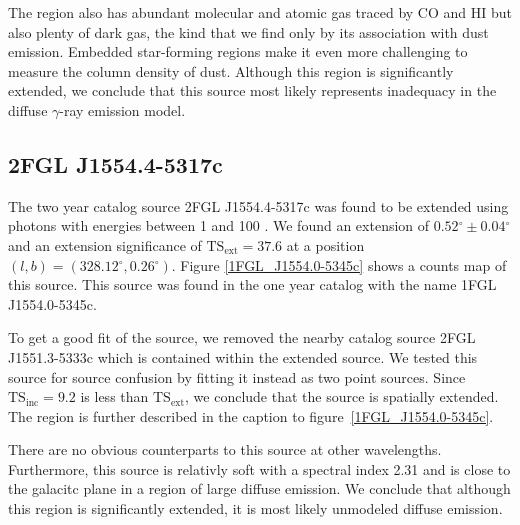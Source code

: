 \documentclass[12pt,preprint]{aastex}
\newcommand{\gev}{\text{GeV}\xspace}
\newcommand{\tsext}{{\ensuremath{\text{TS}_\text{ext}}}\xspace}
\newcommand{\tsinc}{\ensuremath{\text{TS}_\text{inc}}\xspace}
\renewcommand{\deg}{\ensuremath{^\circ}\xspace}
\begin{document}
The region also has abundant molecular and atomic gas traced by CO
and HI but also plenty of dark gas, the kind that we find only by its
association with dust emission. Embedded star-forming regions make it even
more challenging to measure the column density of dust.  Although this
region is significantly extended, we conclude that this source most
likely represents inadequacy in the diffuse $\gamma$-ray emission model.


\subsection{2FGL J1554.4-5317c}
\label{section_2FGL_J1554.4-5317c}


The two year catalog source 2FGL J1554.4-5317c was found to be extended
using photons with energies between 1 \gev and 100 \gev.  We found an
extension of $0.52\deg\pm 0.04\deg$ and an extension significance of
$\tsext=37.6$ at a position $(l,b)=(328.12\deg,0.26\deg)$.  Figure
\ref{1FGL_J1554.0-5345c} shows a counts map of this source.
This source was found in the one year catalog with the name 1FGL J1554.0-5345c.

To get a good fit of the source, we removed the nearby catalog source
2FGL J1551.3-5333c which is contained within the extended source.
We tested this source for source confusion by fitting it instead
as two point sources.  Since $\tsinc=9.2$ is less than \tsext,
we conclude that the source is spatially extended. The region is further described in
the caption to figure~\ref{1FGL_J1554.0-5345c}.

There are no obvious counterparts to this source at other
wavelengths. Furthermore, this source is relativly soft with a spectral
index 2.31 and is close to the galacitc plane in a region of large
diffuse emission.  We conclude that although this region is significantly
extended, it is most likely unmodeled diffuse emission.

\end{document}

